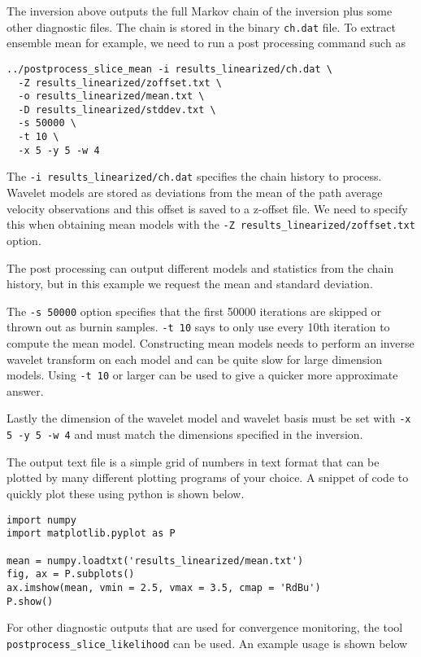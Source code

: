 \documentclass[a4paper,12pt]{article}
\begin{document}
The inversion above outputs the full Markov chain of the inversion plus
some other diagnostic files. The chain is stored in the binary
{\tt ch.dat} file. To extract ensemble mean for example, we need
to run a post processing command such as 


\begin{verbatim}
../postprocess_slice_mean -i results_linearized/ch.dat \
  -Z results_linearized/zoffset.txt \
  -o results_linearized/mean.txt \
  -D results_linearized/stddev.txt \
  -s 50000 \
  -t 10 \
  -x 5 -y 5 -w 4
\end{verbatim}

The {\tt -i results\_linearized/ch.dat} specifies the chain history
to process. Wavelet models are stored as deviations from the mean
of the path average velocity observations and this offset is saved
to a z-offset file. We need to specify this when obtaining
mean models with the {\tt -Z results\_linearized/zoffset.txt} option.

The post processing can output different models and statistics from
the chain history, but in this example we request the mean
and standard deviation.

The {\tt -s 50000} option specifies that the first 50000 iterations are
skipped or thrown out as burnin samples. {\tt -t 10} says to only
use every 10th iteration to compute the mean model. Constructing mean
models needs to perform an inverse wavelet transform on each
model and can be quite slow for large dimension models. Using {\tt -t 10}
or larger can be used to give a quicker more approximate answer.

Lastly the dimension of the wavelet model and wavelet basis must be
set with {\tt -x 5 -y 5 -w 4} and must match the dimensions specified
in the inversion.

The output text file is a simple grid of numbers in text format that can
be plotted by many different plotting programs of your choice. A snippet
of code to quickly plot these using python is shown below.

\begin{verbatim}
import numpy
import matplotlib.pyplot as P

mean = numpy.loadtxt('results_linearized/mean.txt')
fig, ax = P.subplots()
ax.imshow(mean, vmin = 2.5, vmax = 3.5, cmap = 'RdBu')
P.show()
\end{verbatim}

For other diagnostic outputs that are used for convergence monitoring,
the tool {\tt postprocess\_slice\_likelihood} can be used. An example
usage is shown below
\end{document}
